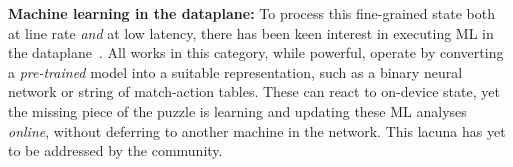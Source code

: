 \documentclass[
sigconf,natbib=false
]{acmart}
\newcommand{\fakepara}[1]{\noindent\textbf{#1:}}
\begin{document}


%
\fakepara{Machine learning in the dataplane}
To process this fine-grained state both at line rate \emph{and} at low latency, there has been keen interest in executing ML in the dataplane~\parencite{DBLP:conf/hotnets/XiongZ19,DBLP:journals/corr/abs-2009-02353}.
All works in this category, while powerful, operate by converting a \emph{pre-trained} model into a suitable representation, such as a binary neural network or string of match-action tables.
These can react to on-device state, yet the missing piece of the puzzle is learning and updating these ML analyses \emph{online}, without deferring to another machine in the network.
This lacuna has yet to be addressed by the community.
\end{document}
